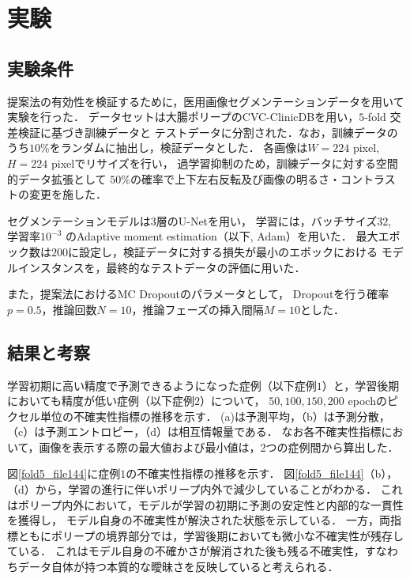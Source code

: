 \documentclass[10pt, a4paper, twocolumn]{jarticle}
\begin{document}
\newpage

\section{実験}
\subsection{実験条件}
提案法の有効性を検証するために，医用画像セグメンテーションデータを用いて実験を行った．
データセットは大腸ポリープのCVC-ClinicDB\cite{BERNAL201599}を用い，$5$-fold 交差検証に基づき訓練データと
テストデータに分割された．なお，訓練データのうち$10 \%$をランダムに抽出し，検証データとした．
各画像は$W = 224$ pixel, $H = 224$ pixelでリサイズを行い，
過学習抑制のため，訓練データに対する空間的データ拡張として
$50\%$の確率で上下左右反転及び画像の明るさ・コントラストの変更を施した．

セグメンテーションモデルは$3$層のU-Net\cite{ronneberger2015u}を用い，
学習には，バッチサイズ$32$, 学習率$10 ^ {-3}$ のAdaptive moment
estimation（以下, Adam）\cite{kingma2014adam}を用いた．
最大エポック数は$200$に設定し，検証データに対する損失が最小のエポックにおける
モデルインスタンスを，最終的なテストデータの評価に用いた．

また，提案法におけるMC Dropoutのパラメータとして，
Dropoutを行う確率$p = 0.5$，推論回数$N = 10$，推論フェーズの挿入間隔$M = 10$とした．

\subsection{結果と考察}
学習初期に高い精度で予測できるようになった症例（以下症例$1$）と，学習後期においても精度が低い症例（以下症例$2$）について，
$50, 100, 150, 200$ epochのピクセル単位の不確実性指標の推移を示す．
(a)は予測平均，（b）は予測分散，（c）は予測エントロピー，（d）は相互情報量である．
なお各不確実性指標において，画像を表示する際の最大値および最小値は，2つの症例間から算出した．

図\ref{fold5_file144}に症例$1$の不確実性指標の推移を示す．
図\ref{fold5_file144}（b），（d）から，学習の進行に伴いポリープ内外で減少していることがわかる．
これはポリープ内外において，モデルが学習の初期に予測の安定性と内部的な一貫性を獲得し，
モデル自身の不確実性が解決された状態を示している．
一方，両指標ともにポリープの境界部分では，学習後期においても微小な不確実性が残存している．
これはモデル自身の不確かさが解消された後も残る不確実性，すなわちデータ自体が持つ本質的な曖昧さを反映していると考えられる．
\end{document}
